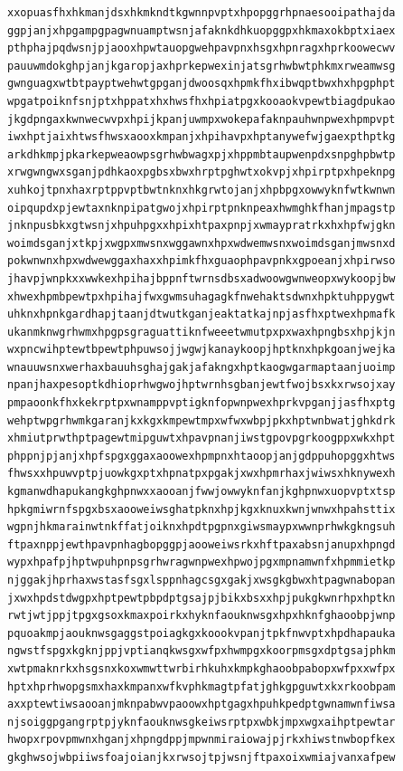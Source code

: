 \documentclass[11pt,letterpaper]{exam}
\begin{document}
\begin{questions}
\begin{verbatim}
xxopuasfhxhkmanjdsxhkmkndtkgwnnpvptxhpopggrhpnaesooipathajda
ggpjanjxhpgampgpagwnuamptwsnjafaknkdhkuopggpxhkmaxokbptxiaex
pthphajpqdwsnjpjaooxhpwtauopgwehpavpnxhsgxhpnragxhprkoowecwv
pauuwmdokghpjanjkgaropjaxhprkepwexinjatsgrhwbwtphkmxrweamwsg
gwnguagxwtbtpayptwehwtgpganjdwoosqxhpmkfhxibwqptbwxhxhpgphpt
wpgatpoiknfsnjptxhppatxhxhwsfhxhpiatpgxkooaokvpewtbiagdpukao
jkgdpngaxkwnwecwvpxhpijkpanjuwmpxwokepafaknpauhwnpwexhpmpvpt
iwxhptjaixhtwsfhwsxaooxkmpanjxhpihavpxhptanywefwjgaexpthptkg
arkdhkmpjpkarkepweaowpsgrhwbwagxpjxhppmbtaupwenpdxsnpghpbwtp
xrwgwngwxsganjpdhkaoxpgbsxbwxhrptpghwtxokvpjxhpirptpxhpeknpg
xuhkojtpnxhaxrptppvptbwtnknxhkgrwtojanjxhpbpgxowwyknfwtkwnwn
oipqupdxpjewtaxnknpipatgwojxhpirptpnknpeaxhwmghkfhanjmpagstp
jnknpusbkxgtwsnjxhpuhpgxxhpixhtpaxpnpjxwmaypratrkxhxhpfwjgkn
woimdsganjxtkpjxwgpxmwsnxwggawnxhpxwdwemwsnxwoimdsganjmwsnxd
pokwnwnxhpxwdwewggaxhaxxhpimkfhxguaophpavpnkxgpoeanjxhpirwso
jhavpjwnpkxxwwkexhpihajbppnftwrnsdbsxadwoowgwnweopxwykoopjbw
xhwexhpmbpewtpxhpihajfwxgwmsuhagagkfnwehaktsdwnxhpktuhppygwt
uhknxhpnkgardhapjtaanjdtwutkganjeaktatkajnpjasfhxptwexhpmafk
ukanmknwgrhwmxhpgpsgraguattiknfweeetwmutpxpxwaxhpngbsxhpjkjn
wxpncwihptewtbpewtphpuwsojjwgwjkanaykoopjhptknxhpkgoanjwejka
wnauuwsnxwerhaxbauuhsghajgakjafakngxhptkaogwgarmaptaanjuoimp
npanjhaxpesoptkdhioprhwgwojhptwrnhsgbanjewtfwojbsxkxrwsojxay
pmpaoonkfhxkekrptpxwnamppvptigknfopwnpwexhprkvpganjjasfhxptg
wehptwpgrhwmkgaranjkxkgxkmpewtmpxwfwxwbpjpkxhptwnbwatjghkdrk
xhmiutprwthptpagewtmipguwtxhpavpnanjiwstgpovpgrkoogppxwkxhpt
phppnjpjanjxhpfspgxggaxaoowexhpmpnxhtaoopjanjgdppuhopggxhtws
fhwsxxhpuwvptpjuowkgxptxhpnatpxpgakjxwxhpmrhaxjwiwsxhknywexh
kgmanwdhapukangkghpnwxxaooanjfwwjowwyknfanjkghpnwxuopvptxtsp
hpkgmiwrnfspgxbsxaooweiwsghatpknxhpjkgxknuxkwnjwnwxhpahsttix
wgpnjhkmarainwtnkffatjoiknxhpdtpgpnxgiwsmaypxwwnprhwkgkngsuh
ftpaxnppjewthpavpnhagbopggpjaooweiwsrkxhftpaxabsnjanupxhpngd
wypxhpafpjhptwpuhpnpsgrhwragwnpwexhpwojpgxmpnamwnfxhpmmietkp
njggakjhprhaxwstasfsgxlsppnhagcsgxgakjxwsgkgbwxhtpagwnabopan
jxwxhpdstdwgpxhptpewtpbpdptgsajpjbikxbsxxhpjpukgkwnrhpxhptkn
rwtjwtjppjtpgxgsoxkmaxpoirkxhyknfaouknwsgxhpxhknfghaoobpjwnp
pquoakmpjaouknwsgaggstpoiagkgxkoookvpanjtpkfnwvptxhpdhapauka
ngwstfspgxkgknjppjvptianqkwsgxwfpxhwmpgxkoorpmsgxdptgsajphkm
xwtpmaknrkxhsgsnxkoxwmwttwrbirhkuhxkmpkghaoobpabopxwfpxxwfpx
hptxhprhwopgsmxhaxkmpanxwfkvphkmagtpfatjghkgpguwtxkxrkoobpam
axxptewtiwsaooanjmknpabwvpaoowxhptgagxhpuhkpedptgwnamwnfiwsa
njsoiggpgangrptpjyknfaouknwsgkeiwsrptpxwbkjmpxwgxaihptpewtar
hwopxrpovpmwnxhganjxhpngdppjmpwnmiraiowajpjrkxhiwstnwbopfkex
gkghwsojwbpiiwsfoajoianjkxrwsojtpjwsnjftpaxoixwmiajvanxafpew

\end{verbatim}
\end{questions}
\end{document}
